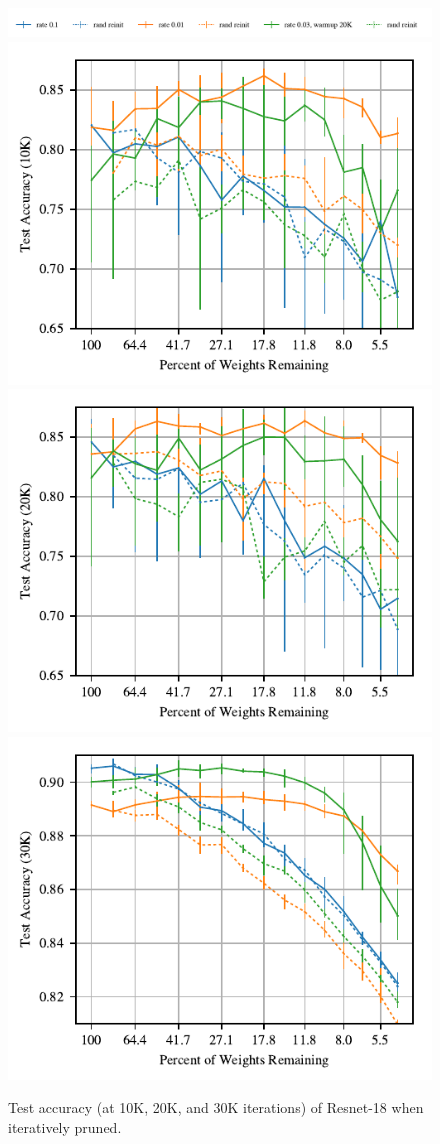 \begin{figure}
\centering
\vspace{-.5em}
\includegraphics[width=.7\textwidth]{graphs/cifar10/icml/resnet18-iclr-10000/legend}%
\vspace{-1em}
\includegraphics[width=.33\textwidth]{graphs/cifar10/icml/resnet18-iclr-10000/accuracy}%
\includegraphics[width=.33\textwidth]{graphs/cifar10/icml/resnet18-iclr-20000/accuracy}%
\includegraphics[width=.33\textwidth]{graphs/cifar10/icml/resnet18-iclr-29900/accuracy}%
\vspace{-1em}
\caption{Test accuracy (at 10K, 20K, and 30K iterations) of Resnet-18 when iteratively pruned.}
\label{fig:resnet18}
\end{figure}

